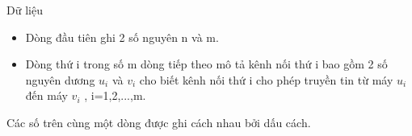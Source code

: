 Dữ liệu
\begin{itemize}
	\item     Dòng đầu tiên ghi 2 số nguyên n và m.   
	\item     Dòng thứ i trong số m dòng tiếp theo mô tả kênh nối thứ i bao gồm 2 số nguyên dương $u_{i}$    và $v_{i}$    cho biết kênh nối thứ i cho phép truyền tin từ máy $u_{i}$    đến máy $v_{i}$    , i=1,2,...,m.   
\end{itemize}

   Các số trên cùng một dòng được ghi cách nhau bởi dấu cách.